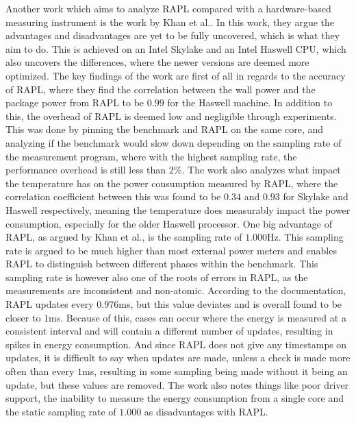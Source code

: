 Another work which aims to analyze RAPL compared with a hardware-based measuring instrument is the work by Khan et al.\cite[]{RAPL_in_action}. In this work, they argue the advantages and disadvantages are yet to be fully uncovered, which is what they aim to do. This is achieved on an Intel Skylake and an Intel Haswell CPU, which also uncovers the differences, where the newer versions are deemed more optimized. The key findings of the work are first of all in regards to the accuracy of RAPL, where they find the correlation between the wall power and the package power from RAPL to be $0.99$ for the Haswell machine. In addition to this, the overhead of RAPL is deemed low and negligible through experiments. This was done by pinning the benchmark and RAPL on the same core, and analyzing if the benchmark would slow down depending on the sampling rate of the measurement program, where with the highest sampling rate, the performance overhead is still less than $2\%$. The work also analyzes what impact the temperature has on the power consumption measured by RAPL, where the correlation coefficient between this was found to be $0.34$ and $0.93$ for Skylake and Haswell respectively, meaning the temperature does measurably impact the power consumption, especially for the older Haswell processor. One big advantage of RAPL, as argued by Khan et al.\cite[]{RAPL_in_action}, is the sampling rate of $1.000$Hz. This sampling rate is argued to be much higher than most external power meters and enables RAPL to distinguish between different phases within the benchmark. This sampling rate is however also one of the roots of errors in RAPL, as the measurements are inconsistent and non-atomic. According to the documentation, RAPL updates every $0.976$ms, but this value deviates and is overall found to be closer to $1$ms. Because of this, cases can occur where the energy is measured at a consistent interval and will contain a different number of updates, resulting in spikes in energy consumption. And since RAPL does not give any timestamps on updates, it is difficult to say when updates are made, unless a check is made more often than every $1$ms, resulting in some sampling being made without it being an update, but these values are removed. The work\cite[]{RAPL_in_action} also notes things like poor driver support, the inability to measure the energy consumption from a single core and the static sampling rate of $1.000$ as disadvantages with RAPL.\cite{RAPL_in_action}\nytafsnit


